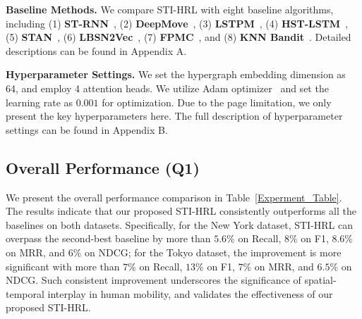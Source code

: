 \documentclass[letterpaper]{article} %
\begin{document}
\noindent \textbf{Baseline Methods.}
We compare STI-HRL with eight baseline algorithms, including (1) \textbf{ST-RNN}~\cite{liu2016predicting}, (2) \textbf{DeepMove}~\cite{feng2018deepmove}, (3) \textbf{LSTPM}~\cite{sun2020go}, (4) \textbf{HST-LSTM}~\cite{DBLP:conf/ijcai/Kong018}, (5) \textbf{STAN}~\cite{DBLP:conf/www/LuoLL21}, (6) \textbf{LBSN2Vec}~\cite{yang2019revisiting}, (7) \textbf{FPMC}~\cite{rendle2010factorizing}, and (8) \textbf{KNN Bandit}~\cite{sanz2019simple}.
Detailed descriptions can be found in Appendix A.

\noindent \textbf {Hyperparameter Settings.}
We set the hypergraph embedding dimension as 64, and employ 4 attention heads.
We utilize Adam optimizer~\cite{diederik2014adam} and set the learning rate as $0.001$ for optimization.
Due to the page limitation, we only present the key hyperparameters here.
The full description of hyperparameter settings can be found in Appendix B.


\subsection{Overall Performance (Q1)}
We present the overall performance comparison in Table~\ref{Experment_Table}.
The results indicate that our proposed STI-HRL consistently outperforms all the baselines on both datasets.
Specifically, for the New York dataset, STI-HRL can overpass the second-best baseline by more than $5.6\%$ on Recall, $8\%$ on F1, $8.6\%$ on MRR, and $6\%$ on NDCG;
for the Tokyo dataset, the improvement is more significant with more than $7\%$ on Recall, $13\%$ on F1, $7\%$ on MRR, and $6.5\%$ on NDCG.
Such consistent improvement underscores the significance of spatial-temporal interplay in human mobility, and validates the effectiveness of our proposed STI-HRL.
\end{document}
